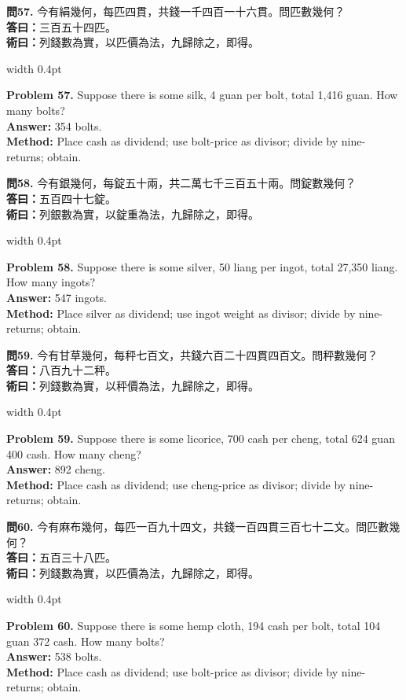 \documentclass[10pt,a4paper]{article}
\newlength{\cnwidth}
\newlength{\enwidth}
\newcommand{\bilingual}[2]{%
  \noindent%
  \begin{minipage}[t]{\cnwidth}%
    #1%
  \end{minipage}%
  \hfill\vrule width 0.4pt\hfill%
  \begin{minipage}[t]{\enwidth}%
    #2%
  \end{minipage}%
  \par\smallskip%
}
\begin{document}
\bilingual{%
  \textbf{問57.}
  今有絹幾何，每匹四貫，共錢一千四百一十六貫。問匹數幾何？\\
  \textbf{答曰：}三百五十四匹。\\
  \textbf{術曰：}列錢數為實，以匹價為法，九歸除之，即得。
}{%
  \textbf{Problem 57.}
  Suppose there is some silk, 4 guan per bolt, total 1,416 guan.
  How many bolts?\\
  \textbf{Answer:} 354 bolts.\\
  \textbf{Method:} Place cash as dividend; use bolt-price as divisor; divide by
  nine-returns; obtain.
}

\bilingual{%
  \textbf{問58.}
  今有銀幾何，每錠五十兩，共二萬七千三百五十兩。問錠數幾何？\\
  \textbf{答曰：}五百四十七錠。\\
  \textbf{術曰：}列銀數為實，以錠重為法，九歸除之，即得。
}{%
  \textbf{Problem 58.}
  Suppose there is some silver, 50 liang per ingot, total 27,350 liang.
  How many ingots?\\
  \textbf{Answer:} 547 ingots.\\
  \textbf{Method:} Place silver as dividend; use ingot weight as divisor;
  divide by nine-returns; obtain.
}

\bilingual{%
  \textbf{問59.}
  今有甘草幾何，每秤七百文，共錢六百二十四貫四百文。問秤數幾何？\\
  \textbf{答曰：}八百九十二秤。\\
  \textbf{術曰：}列錢數為實，以秤價為法，九歸除之，即得。
}{%
  \textbf{Problem 59.}
  Suppose there is some licorice, 700 cash per cheng, total 624 guan 400 cash.
  How many cheng?\\
  \textbf{Answer:} 892 cheng.\\
  \textbf{Method:} Place cash as dividend; use cheng-price as divisor; divide by
  nine-returns; obtain.
}

\bilingual{%
  \textbf{問60.}
  今有麻布幾何，每匹一百九十四文，共錢一百四貫三百七十二文。問匹數幾何？\\
  \textbf{答曰：}五百三十八匹。\\
  \textbf{術曰：}列錢數為實，以匹價為法，九歸除之，即得。
}{%
  \textbf{Problem 60.}
  Suppose there is some hemp cloth, 194 cash per bolt, total 104 guan 372 cash.
  How many bolts?\\
  \textbf{Answer:} 538 bolts.\\
  \textbf{Method:} Place cash as dividend; use bolt-price as divisor; divide by
  nine-returns; obtain.
}
\end{document}
